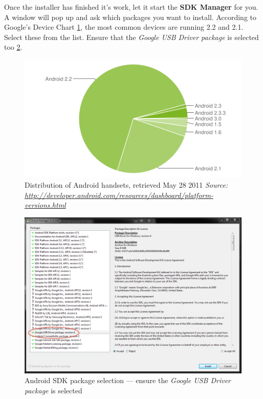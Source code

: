 Once the installer has finished it's work, let it start the \textbf{SDK Manager} for you. A window will pop up and ask which packages you want to install.
According to Google's Device Chart \ref{fig:device_chart}, the most common devices are running 2.2 and 2.1. Select these from the list. Ensure that the \emph{Google USB Driver package} is selected too \ref{fig:windows_usb_driver}.

\begin{figure}[!ht]
  \includegraphics[width=\textwidth]{./images/device_chart.png}%
  \caption{Distribution of Android handsets, retrieved May 28 2011
  \emph{Source: \url{http://developer.android.com/resources/dashboard/platform-versions.html}}}%
  \label{fig:device_chart}%
\end{figure}

\begin{figure}[!ht]
  \includegraphics[width=\textwidth]{./images/windows_usb_driver.png}%
  \caption{Android SDK package selection --- ensure the \emph{Google USB Driver package} is selected}%
  \label{fig:windows_usb_driver}
\end{figure}

